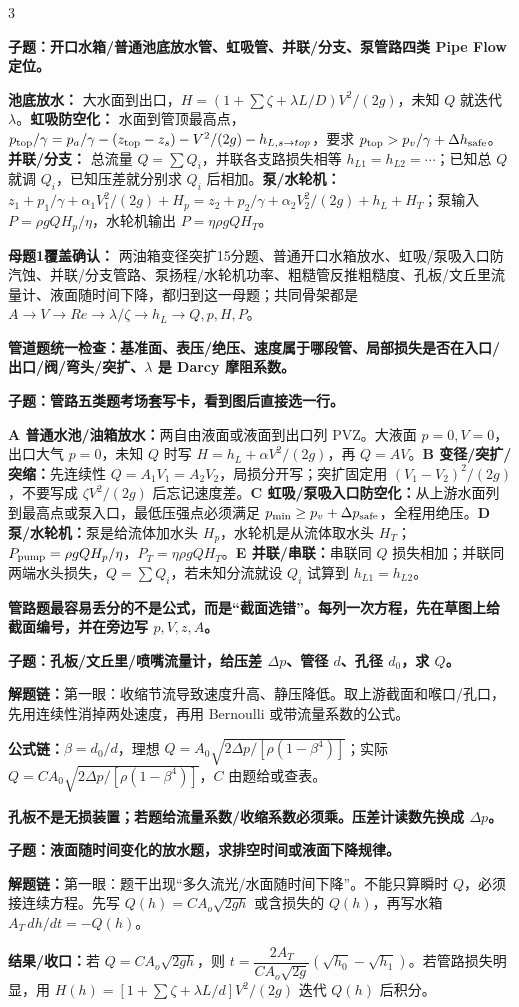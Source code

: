 \documentclass[a4paper]{article}
\newcommand{\qt}[1]{\vspace{0.25pt}\colorbox{Q}{\parbox{\dimexpr\linewidth-2\fboxsep}{\color{white}\bfseries #1}}\par}
\newcommand{\ans}[1]{\colorbox{G}{\parbox{\dimexpr\linewidth-2\fboxsep}{#1}}\par}
\newcommand{\warn}[1]{\colorbox{Y}{\parbox{\dimexpr\linewidth-2\fboxsep}{\color{E}\bfseries #1}}\par}
\newcommand{\chain}[1]{{\color{A}\bfseries 解题链：}#1\par}
\newcommand{\res}[1]{{\color{E}\bfseries 结果/收口：}#1\par}
\newcommand{\form}[1]{{\color{M}\bfseries 公式链：}#1\par}
\begin{document}
\begin{multicols}{3}
\qt{子题：开口水箱/普通池底放水管、虹吸管、并联/分支、泵管路四类 Pipe Flow 定位。}
\ans{\textbf{池底放水：} 大水面到出口，$H=(1+\sum\zeta+\lambda L/D)V^2/(2g)$，未知 $Q$ 就迭代 $\lambda$。\textbf{虹吸防空化：} 水面到管顶最高点，$p_{\rm top}/\gamma=p_a/\gamma-(z_{\rm top}-z_s)-V^2/(2g)-h_{L,s\to top}$，要求 $p_{\rm top}>p_v/\gamma+\Delta h_{\rm safe}$。\textbf{并联/分支：} 总流量 $Q=\sum Q_i$，并联各支路损失相等 $h_{L1}=h_{L2}=\cdots$；已知总 $Q$ 就调 $Q_i$，已知压差就分别求 $Q_i$ 后相加。\textbf{泵/水轮机：} $z_1+p_1/\gamma+\alpha_1V_1^2/(2g)+H_p=z_2+p_2/\gamma+\alpha_2V_2^2/(2g)+h_L+H_T$；泵输入 $P=\rho gQH_p/\eta$，水轮机输出 $P=\eta\rho gQH_T$。}
\ans{\textbf{母题1覆盖确认：} 两油箱变径突扩15分题、普通开口水箱放水、虹吸/泵吸入口防汽蚀、并联/分支管路、泵扬程/水轮机功率、粗糙管反推粗糙度、孔板/文丘里流量计、液面随时间下降，都归到这一母题；共同骨架都是 $A\to V\to Re\to\lambda/\zeta\to h_L\to Q,p,H,P$。}
\warn{管道题统一检查：基准面、表压/绝压、速度属于哪段管、局部损失是否在入口/出口/阀/弯头/突扩、$\lambda$ 是 Darcy 摩阻系数。}

\qt{子题：管路五类题考场套写卡，看到图后直接选一行。}
\ans{\textbf{A 普通水池/油箱放水：}两自由液面或液面到出口列 PVZ。大液面 $p=0,V=0$，出口大气 $p=0$，未知 $Q$ 时写 $H=h_L+\alpha V^2/(2g)$，再 $Q=AV$。\textbf{B 变径/突扩/突缩：}先连续性 $Q=A_1V_1=A_2V_2$，局损分开写；突扩固定用 $(V_1-V_2)^2/(2g)$，不要写成 $\zeta V^2/(2g)$ 后忘记速度差。\textbf{C 虹吸/泵吸入口防空化：}从上游水面列到最高点或泵入口，最低压强点必须满足 $p_{\min}\ge p_v+\Delta p_{\rm safe}$，全程用绝压。\textbf{D 泵/水轮机：}泵是给流体加水头 $H_p$，水轮机是从流体取水头 $H_T$；$P_{\rm pump}=\rho gQH_p/\eta$，$P_T=\eta\rho gQH_T$。\textbf{E 并联/串联：}串联同 $Q$ 损失相加；并联同两端水头损失，$Q=\sum Q_i$，若未知分流就设 $Q_i$ 试算到 $h_{L1}=h_{L2}$。}
\warn{管路题最容易丢分的不是公式，而是“截面选错”。每列一次方程，先在草图上给截面编号，并在旁边写 $p,V,z,A$。}

\qt{子题：孔板/文丘里/喷嘴流量计，给压差 $\Delta p$、管径 $d$、孔径 $d_0$，求 $Q$。}
\chain{第一眼：收缩节流导致速度升高、静压降低。取上游截面和喉口/孔口，先用连续性消掉两处速度，再用 Bernoulli 或带流量系数的公式。}
\form{$\beta=d_0/d$，理想 $Q=A_0\sqrt{2\Delta p/[\rho(1-\beta^4)]}$；实际 $Q=C A_0\sqrt{2\Delta p/[\rho(1-\beta^4)]}$，$C$ 由题给或查表。}
\warn{孔板不是无损装置；若题给流量系数/收缩系数必须乘。压差计读数先换成 $\Delta p$。}

\qt{子题：液面随时间变化的放水题，求排空时间或液面下降规律。}
\chain{第一眼：题干出现“多久流光/水面随时间下降”。不能只算瞬时 $Q$，必须接连续方程。先写 $Q(h)=C A_o\sqrt{2gh}$ 或含损失的 $Q(h)$，再写水箱 $A_T\,dh/dt=-Q(h)$。}
\res{若 $Q=C A_o\sqrt{2gh}$，则 $t=\dfrac{2A_T}{C A_o\sqrt{2g}}\left(\sqrt{h_0}-\sqrt{h_1}\right)$。若管路损失明显，用 $H(h)=[1+\sum\zeta+\lambda L/d]V^2/(2g)$ 迭代 $Q(h)$ 后积分。}



\end{multicols}
\end{document}

